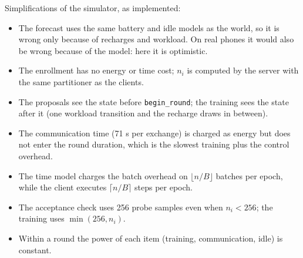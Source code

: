 \documentclass[11pt,a4paper]{article}
\newcommand{\cf}[1]{\texttt{#1}}
\begin{document}
Simplifications of the simulator, as implemented:
\begin{itemize}
  \item The forecast uses the same battery and idle models as the world, so it
        is wrong only because of recharges and workload. On real phones it would
        also be wrong because of the model: here it is optimistic.
  \item The enrollment has no energy or time cost; $n_i$ is computed by the
        server with the same partitioner as the clients.
  \item The proposals see the state before \cf{begin\_round}; the training sees
        the state after it (one workload transition and the recharge draws in
        between).
  \item The communication time (71 s per exchange) is charged as energy but
        does not enter the round duration, which is the slowest training plus
        the control overhead.
  \item The time model charges the batch overhead on $\lfloor n/B \rfloor$
        batches per epoch, while the client executes $\lceil n/B \rceil$ steps
        per epoch.
  \item The acceptance check uses 256 probe samples even when $n_i < 256$; the
        training uses $\min(256, n_i)$.
  \item Within a round the power of each item (training, communication, idle)
        is constant.
\end{itemize}
\end{document}

